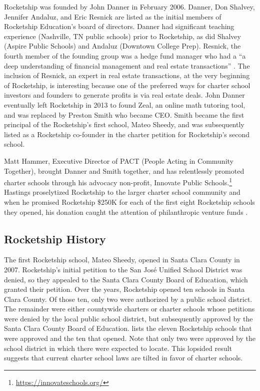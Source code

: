 Rocketship was founded by John Danner in February 2006. Danner, Don Shalvey, Jennifer Andaluz, and Eric Resnick are listed as the initial members of Rocketship Education's board of directors. Danner had significant teaching experience (Nashville, TN public schools) prior to Rocketship, as did Shalvey (Aspire Public Schools) and Andaluz (Downtown College Prep). Resnick, the fourth member of the founding group was a hedge fund manager who had a ``a deep understanding of financial management and real estate transactions'' \parencite[13]{Danner2006}. The inclusion of Resnick, an expert in real estate transactions, at the very beginning of Rocketship, is interesting because one of the preferred ways for charter school investors and founders to generate profits is via real estate deals. John Danner eventually left Rocketship in 2013 to found Zeal, an online math tutoring tool, and was replaced by Preston Smith who became CEO\@. Smith became the first principal of the Rocketship's first school, Mateo Sheedy, and was subsequently listed as a Rocketship co-founder in the charter petition for Rocketship's second school. %

Matt Hammer, Executive Director of PACT (People Acting in Community Together), brought Danner and Smith together, and has relentlessly promoted charter schools through his advocacy non-profit, Innovate Public  Schools.\footnote{\url{https://innovateschools.org/}} Hastings proselytized Rocketship to the larger charter school community and when he promised Rocketship \$250K for each of the first eight Rocketship schools they opened, his donation caught the attention of philanthropic venture funds \parencite[50]{Whitmire2014}. 

\subsection{Rocketship History}\label{sec:rocketship-history}\indent

The first Rocketship school, Mateo Sheedy, opened in Santa Clara County in 2007. Rocketship's initial petition to the San José Unified School District was denied, so they appealed to the Santa Clara County Board of Education, which granted their petition. Over the years, Rocketship opened ten schools in Santa Clara County. Of those ten, only two were authorized by a public school district. The remainder were either countywide charters or charter schools whose petitions were denied by the local public school district, but subsequently approved by the Santa Clara County Board of Education.  lists the eleven Rocketship schools that were approved and the ten that opened. Note that only two were approved by the school district in which there were expected to locate. This lopsided result suggests that current charter school laws are tilted in favor of charter schools. 

